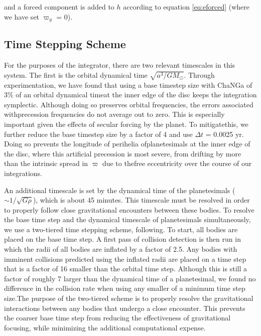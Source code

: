 \noindent and a forced component is added to $h$ according to equation \ref{eq:eforced} (where we have set $\varpi_{g}$ = 0).

\subsection{Time Stepping Scheme}\label{sec:timestep}

For the purposes of the integrator, there are two relevant timescales in this system. The first is the orbital dynamical time 
$\sqrt{a^3/G M_{\odot}}$. Through experimentation, we have found that using a base timestep size with {\sc ChaNGa} of 3\% of 
an orbital dynamical timeat the inner edge of the disc keeps the integration symplectic. Although doing so preserves orbital 
frequencies, the errors associated withprecession frequencies do not average out to zero. This is especially important given the 
effects of secular forcing by the planet. To mitigatethis, we further reduce the base timestep size by a factor of 4 and use $\Delta 
t$ = 0.0025 yr. Doing so prevents the longitude of perihelia ofplanetesimals at the inner edge of the disc, where this artificial 
precession is most severe, from drifting by more than the intrinsic spread in $\varpi$ due to thefree eccentricity over the course 
of our integrations.

An additional timescale is set by the dynamical time of the planetesimals ($\sim 1/\sqrt{G \rho}$), which is about 45 minutes. This 
timescale must be resolved in order to properly follow close gravitational encounters between these bodies. To resolve the base 
time step and the dynamical timescale of planetesimals simultaneously, we use a two-tiered time stepping scheme, 
following\cite{leinhardt15}. To start, all bodies are placed on the base time step. A first pass of collision detection is then run in 
which the radii of all bodies are inflated by a factor of 2.5. Any bodies with imminent collisions predicted using the inflated radii 
are placed on a time step that is a factor of 16 smaller than the orbital time step. Although this is still a factor of roughly 7 larger 
than the dynamical time of a planetesimal, we found no difference in the collision rate when using any smaller of a minimum time 
step size.The purpose of the two-tiered scheme is to properly resolve the gravitational interactions between any bodies that 
undergo a close encounter. This prevents the coarser base time step from reducing the effectiveness of gravitational focusing, 
while minimizing the additional computational expense.

